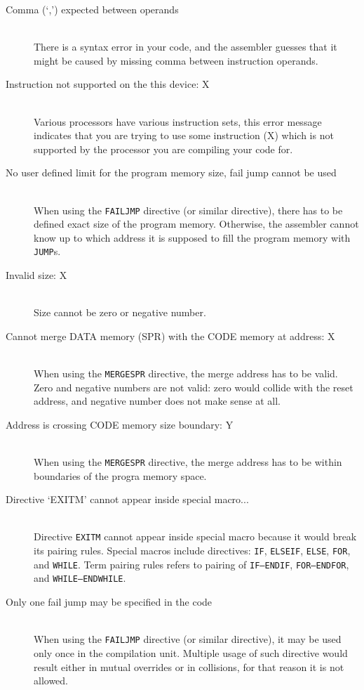 \begin{description}
        \item[Comma (`,') expected between operands]~\\
            There is a syntax error in your code, and the assembler guesses that it might be caused by missing comma between instruction operands.
        \item[Instruction not supported on the this device: X]~\\
            Various processors have various instruction sets, this error message indicates that you are trying to use some instruction (X) which is not supported by the processor you are compiling your code for.
        \item[No user defined limit for the program memory size, fail jump cannot be used]~\\
            When using the \texttt{FAILJMP} directive (or similar directive), there has to be defined exact size of the program memory. Otherwise, the assembler cannot know up to which address it is supposed to fill the program memory with \texttt{JUMP}s.
        \item[Invalid size: X]~\\
            Size cannot be zero or negative number.
        \item[Cannot merge DATA memory (SPR) with the CODE memory at address: X]~\\
            When using the \texttt{MERGESPR} directive, the merge address has to be valid. Zero and negative numbers are not valid: zero would collide with the reset address, and negative number does not make sense at all.
        \item[Address is crossing CODE memory size boundary: Y]~\\
            When using the \texttt{MERGESPR} directive, the merge address has to be within boundaries of the progra memory space.
        \item[Directive `EXITM' cannot appear inside special macro...]~\\
            Directive \texttt{EXITM} cannot appear inside special macro because it would break its pairing rules. Special macros include directives: \texttt{IF}, \texttt{ELSEIF}, \texttt{ELSE}, \texttt{FOR}, and \texttt{WHILE}. Term pairing rules refers to pairing of \texttt{IF--ENDIF}, \texttt{FOR--ENDFOR}, and \texttt{WHILE--ENDWHILE}.
        \item[Only one fail jump may be specified in the code]~\\
            When using the \texttt{FAILJMP} directive (or similar directive), it may be used only once in the compilation unit. Multiple usage of such directive would result either in mutual overrides or in collisions, for that reason it is not allowed.

\end{description}

